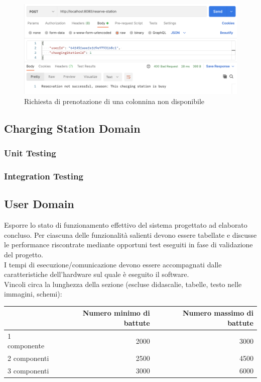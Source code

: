 \begin{figure}[htbp]
    \centering
    \includegraphics[width=\textwidth]{images/reserveNotOk.png}
    \caption{Richiesta di prenotazione di una colonnina non disponibile}
    \label{fig:reserveNotOk}
\end{figure}

\subsection{Charging Station Domain}
\subsubsection{Unit Testing}
\subsubsection{Integration Testing}

\subsection{User Domain}

Esporre lo stato di funzionamento effettivo del sistema progettato ad elaborato concluso. Per ciascuna delle funzionalità salienti devono essere tabellate e discusse le performance riscontrate mediante opportuni test eseguiti in fase di validazione del progetto.\\

I tempi di esecuzione/comunicazione devono essere accompagnati dalle caratteristiche dell'hardware sul quale è eseguito il software.\\


Vincoli circa la lunghezza della sezione (escluse didascalie, tabelle, testo nelle immagini, schemi):

\vspace{1cm}
\begin{tabular}{l|rr}
                 & Numero minimo di battute & Numero massimo di battute \\
    \hline
    1 componente & 2000                     & 3000                      \\
    2 componenti & 2500                     & 4500                      \\
    3 componenti & 3000                     & 6000                      \\
    \hline
\end{tabular}


\newpage
